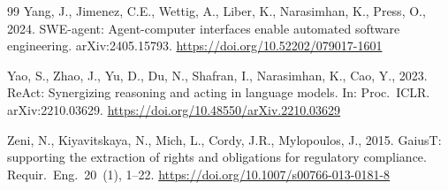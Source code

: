 \documentclass[smallextended,natbib]{svjour3}
\begin{document}
\begin{thebibliography}{99}
Yang, J., Jimenez, C.E., Wettig, A., Liber, K., Narasimhan, K., Press, O., 2024. SWE-agent: Agent-computer interfaces enable automated software engineering. arXiv:2405.15793. \url{https://doi.org/10.52202/079017-1601}

Yao, S., Zhao, J., Yu, D., Du, N., Shafran, I., Narasimhan, K., Cao, Y., 2023. ReAct: Synergizing reasoning and acting in language models. In: Proc.\ ICLR. arXiv:2210.03629. \url{https://doi.org/10.48550/arXiv.2210.03629}

Zeni, N., Kiyavitskaya, N., Mich, L., Cordy, J.R., Mylopoulos, J., 2015. GaiusT: supporting the extraction of rights and obligations for regulatory compliance. Requir.\ Eng.\ 20~(1), 1--22. \url{https://doi.org/10.1007/s00766-013-0181-8}

\end{thebibliography}
\end{document}

